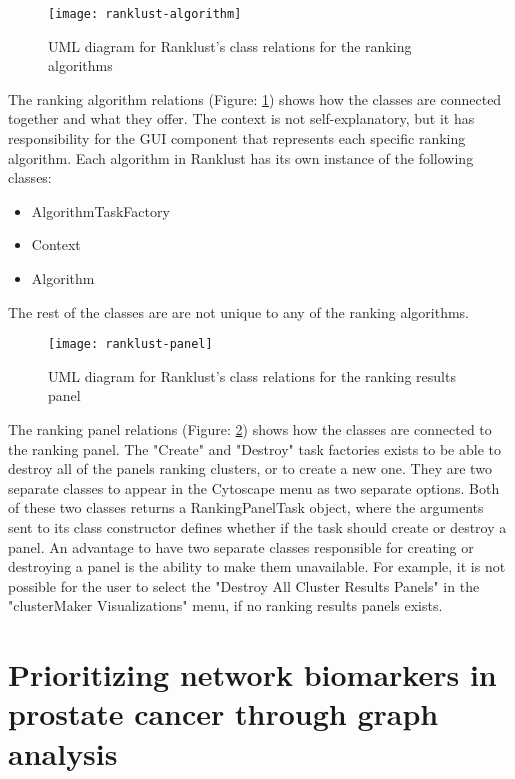 \begin{figure}[H]
    \texttt{[image: ranklust-algorithm]}
    \caption{UML diagram for Ranklust's class relations for the ranking
    algorithms}
    \label{fig:rank-alg}
\end{figure}

The ranking algorithm relations (Figure: \ref{fig:rank-alg}) shows how the
classes are connected together and what they offer. The context is not
self-explanatory, but it has responsibility for the GUI component that
represents each specific ranking algorithm. Each algorithm in Ranklust has its
own instance of the following classes:

\begin{itemize}
    \item AlgorithmTaskFactory
    \item Context
    \item Algorithm
\end{itemize}

The rest of the classes are are not unique to any of the ranking algorithms.

\begin{figure}[H]
    \texttt{[image: ranklust-panel]}
    \caption{UML diagram for Ranklust's class relations for the ranking results
    panel}
    \label{fig:rank-panel}
\end{figure}

The ranking panel relations (Figure: \ref{fig:rank-panel}) shows how the classes
are connected to the ranking panel. The "Create" and "Destroy" task factories
exists to be able to destroy all of the panels ranking clusters, or to create
a new one. They are two separate classes to appear in the Cytoscape menu as two
separate options. Both of these two classes returns a RankingPanelTask object,
where the arguments sent to its class constructor defines whether if the task
should create or destroy a panel. An advantage to have two separate classes
responsible for creating or destroying a panel is the ability to make them
unavailable. For example, it is not possible for the user to select the "Destroy
All Cluster Results Panels" in the "clusterMaker Visualizations" menu, if no
ranking results panels exists.

\chapter{Prioritizing network biomarkers in prostate cancer through graph analysis}
